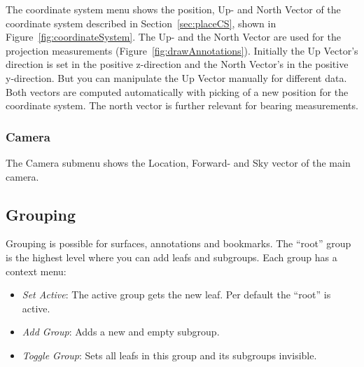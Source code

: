 The coordinate system menu shows the position, Up- and North Vector of the coordinate system described in Section~\ref{sec:placeCS}, shown in Figure~\ref{fig:coordinateSystem}.
The Up- and the North Vector are used for the projection measurements (Figure~\ref{fig:drawAnnotations}). Initially the Up Vector's direction is set in the positive z-direction and the North Vector's in the positive y-direction. But you can manipulate the Up Vector manually for different data. Both vectors are computed automatically with picking of a new position for the coordinate system. The north vector is further relevant for bearing measurements. %

\subsubsection{Camera} 

The Camera submenu shows the Location, Forward- and Sky vector of the main camera.
\subsection{Grouping}
\label{sec:grouping}


Grouping is possible for surfaces, annotations and bookmarks.
The ``root'' group is the highest level where you can add leafs and subgroups.
Each group has a context menu:
\begin{itemize}
	\item \textit{Set Active}: The active group gets the new leaf. Per default the ``root'' is active.
	\item \textit{Add Group}: Adds a new and empty subgroup.
	\item \textit{Toggle Group}: Sets all leafs in this group and its subgroups invisible.
\end{itemize}

